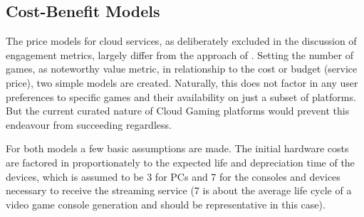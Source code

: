 
%


\subsection{Cost-Benefit Models}


The price models for cloud services, as deliberately excluded in the discussion of engagement metrics, largely differ from the approach of \steam. Setting the number of games, as noteworthy value metric, in relationship to the cost or budget (service price), two simple models are created. Naturally, this does not factor in any user preferences to specific games and their availability on just a subset of platforms. But the current curated nature of Cloud Gaming platforms would prevent this endeavour from succeeding regardless.



For both models a few basic assumptions are made. The initial hardware costs are factored in proportionately to the expected life and depreciation time of the devices, which is assumed to be \SI{3}{\year} for PCs and \SI{7}{\year} for the consoles and devices necessary to receive the streaming service (\SI{7}{\year} is about the average life cycle of a video game console generation and should be representative in this case).


